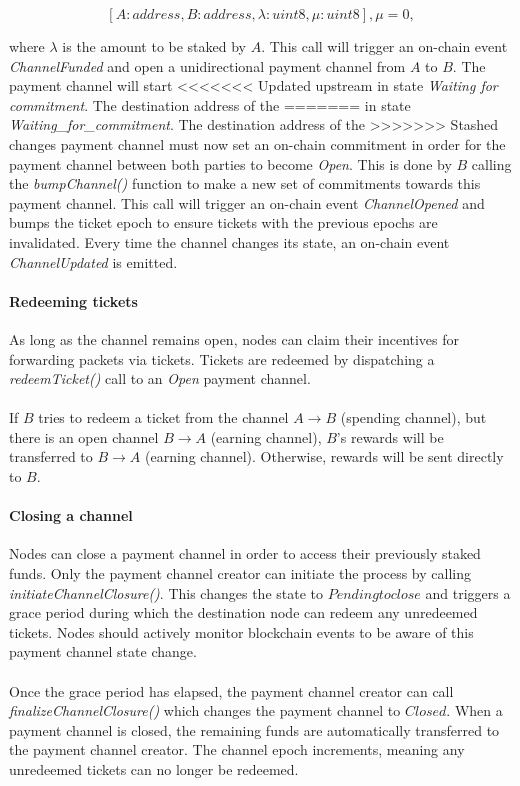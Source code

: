 $$[A: address, B: address, \lambda: uint8, \mu: uint8], \mu = 0,$$

where $\lambda$ is the amount to be staked by $A$. This call will trigger an on-chain event \textit{ChannelFunded}
and open a unidirectional payment channel from $A$ to $B$. The payment channel will start
<<<<<<< Updated upstream
in state \textit{Waiting for commitment}. The destination address of the
=======
in state \textit{Waiting\_for\_commitment}. The destination address of the
>>>>>>> Stashed changes
payment channel must now set an on-chain commitment in order for the payment
channel between both parties to become \textit{Open}. This is done by $B$
calling the \textit{bumpChannel()} function to make a new set of commitments
towards this payment channel. This call will trigger an on-chain event
\textit{ChannelOpened} and bumps the ticket epoch to ensure tickets with the
previous epochs are invalidated. Every time the channel changes its state, an on-chain event \textit{ChannelUpdated} is emitted.

\paragraph{Redeeming tickets}
As long as the channel remains open, nodes can claim their incentives for
forwarding packets via tickets. Tickets are redeemed by dispatching a
\textit{redeemTicket()} call to an \textit{Open} payment channel.
\\~\\If $B$ tries to redeem a ticket from the channel $A\rightarrow B$ (spending
channel), but there is an open channel $B\rightarrow A$ (earning channel),
$B$'s rewards will be transferred to $B\rightarrow A$ (earning channel).
Otherwise, rewards will be sent directly to $B$.

\paragraph{Closing a channel}
Nodes can close a payment channel in order to access their previously staked
funds. Only the payment channel creator can initiate the process by calling
\textit{initiateChannelClosure()}. This changes the state to $Pending to close$
and triggers a grace period during which the destination node can redeem
any unredeemed tickets. Nodes should actively monitor blockchain events to
be aware of this payment channel state change.
\\~\\Once the grace period has elapsed, the payment channel creator can call
\textit{finalizeChannelClosure()} which changes the payment channel to
$Closed$. When a payment channel is closed, the remaining funds are automatically transferred
to the payment channel creator. The channel epoch increments, meaning any unredeemed tickets can no longer be redeemed.

